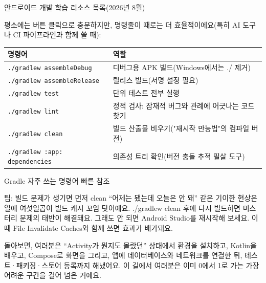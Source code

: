 \begin{center}\small\color{gray}안드로이드 개발 학습 리소스 목록(2026년 8월)\end{center}


평소에는 버튼 클릭으로 충분하지만, 명령줄이 때로는 더 효율적이에요(특히 AI 도구나 CI 파이프라인과 함께 쓸 때):

\begin{center}
\begin{tabularx}{\linewidth}{|X|X|}
\hline
\textbf{명령어} & \textbf{역할} \tabularnewline
\hline
\texttt{.\allowbreak /\allowbreak gradlew assembleDebug} & 디버그용 APK 빌드(Windows에서는 ./ 제거) \tabularnewline
\texttt{.\allowbreak /\allowbreak gradlew assembleRelease} & 릴리스 빌드(서명 설정 필요) \tabularnewline
\texttt{.\allowbreak /\allowbreak gradlew test} & 단위 테스트 전부 실행 \tabularnewline
\texttt{.\allowbreak /\allowbreak gradlew lint} & 정적 검사: 잠재적 버그와 관례에 어긋나는 코드 찾기 \tabularnewline
\texttt{.\allowbreak /\allowbreak gradlew clean} & 빌드 산출물 비우기("재시작 만능법"의 컴파일 버전) \tabularnewline
\texttt{.\allowbreak /\allowbreak gradlew :app: dependencies} & 의존성 트리 확인(버전 충돌 추적 필살 도구) \tabularnewline
\hline
\end{tabularx}
\end{center}

\begin{center}\small\color{gray}Gradle 자주 쓰는 명령어 빠른 참조\end{center}

\begin{tcbinfo}{팁: 빌드 문제가 생기면 먼저 clean}
“어제는 됐는데 오늘은 안 돼” 같은 기이한 현상은 열에 여섯일곱이 빌드 캐시 꼬임 탓이에요. ./gradlew clean 후에 다시 빌드하면 미스터리 문제의 태반이 해결돼요. 그래도 안 되면 Android Studio를 재시작해 보세요. 이때 File Invalidate Caches와 함께 쓰면 효과가 배가돼요.

\end{tcbinfo}



돌아보면, 여러분은 “Activity가 뭔지도 몰랐던” 상태에서 환경을 설치하고, Kotlin을 배우고, Compose로 화면을 그리고, 앱에 데이터베이스와 네트워크를 연결한 뒤, 테스트·패키징·스토어 등록까지 해냈어요. 이 길에서 여러분은 이미 0에서 1로 가는 가장 어려운 구간을 걸어 넘은 거예요.

